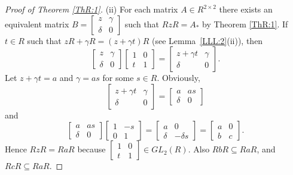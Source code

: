 \documentclass{cimart}
\begin{document}
\begin{proof}[Proof of Theorem \ref{ThR:1}]
(ii) For each matrix $A\in R^{2\times 2}$ there exists an equivalent matrix
$B=\left[\begin{array}{cc}
 z & \gamma \\
\delta & 0
\end{array}\right]$
such that $RzR=A_*$ by Theorem \ref{ThR:1}. If  $t\in R$ such that $zR+\gamma R=(z+\gamma t)R$ (see Lemma~\ref{LLL:2}(ii)), then
\[
        \left[\begin{array}{cc}
          z & \gamma \\
          \delta & 0
        \end{array}\right]\left[\begin{array}{cc}
          1 & 0 \\
          t & 1
        \end{array}\right]=\left[\begin{array}{cc}
          z+\gamma t & \gamma \\
          \delta & 0
        \end{array}\right].
\]
Let $z+\gamma t=a$ and $\gamma=as$ for some $s\in R$. Obviously,
\[
        \left[\begin{array}{cc}
          z+\gamma t & \gamma \\
          \delta & 0
        \end{array}\right]=\left[\begin{array}{cc}
          a & as \\
          \delta & 0
        \end{array}\right]
\]
        and
\[
        \left[\begin{array}{cc}
          a & as \\
          \delta & 0
        \end{array}\right]\left[\begin{array}{cc}
          1 & -s \\
          0 & 1
        \end{array}\right]=\left[\begin{array}{cc}
          a & 0 \\
          \delta & -\delta s
        \end{array}\right]=\left[\begin{array}{cc}
          a & 0 \\
          b & c
        \end{array}\right].
\]
Hence $RzR=RaR$  because $\left[\begin{array}{cc}
          1 & 0 \\
          t & 1
       \end{array}\right]\in GL_2(R)$. Also  $RbR\subseteq RaR$, and $RcR\subseteq RaR$. \end{proof}
\end{document}

